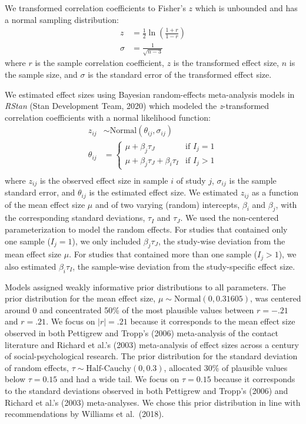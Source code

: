\documentclass[12pt, letterpaper]{article}
\begin{document}
We transformed correlation coefficients to Fisher's \(z\) which is
unbounded and has a normal sampling distribution: \begin{align*} 
z & = \frac{1}{2} \ln\left(\frac{1 + r}{1 - r}\right) \\ \sigma & = \frac{1}{\sqrt{n - 3}} \end{align*}
where \(r\) is the sample correlation coefficient, \(z\) is the
transformed effect size, \(n\) is the sample size, and \(\sigma\) is the
standard error of the transformed effect size.

We estimated effect sizes using Bayesian random-effects meta-analysis
models in \emph{RStan} (Stan Development Team, 2020) which modeled the
\emph{z}-transformed correlation coefficients with a normal likelihood
function:
\begin{align*} z_{ij} &\sim \text{Normal}(\theta_{ij}, \sigma_{ij}) \\ \theta_{ij} &= \begin{cases} \mu + \beta_j\tau_J & \text{if } I_j = 1 \\ \mu + \beta_j\tau_J + \beta_i\tau_I & \text{if } I_j > 1 \end{cases} \\ \end{align*}
where \(z_{ij}\) is the observed effect size in sample \(i\) of study
\(j\), \(\sigma_{ij}\) is the sample standard error, and \(\theta_{ij}\)
is the estimated effect size. We estimated \(z_{ij}\) as a function of
the mean effect size \(\mu\) and of two varying (random) intercepts,
\(\beta_i\) and \(\beta_j\), with the corresponding standard deviations,
\(\tau_I\) and \(\tau_J\). We used the non-centered parameterization to
model the random effects. For studies that contained only one sample
(\(I_j = 1\)), we only included \(\beta_j\tau_J\), the study-wise
deviation from the mean effect size \(\mu\). For studies that contained
more than one sample (\(I_j > 1\)), we also estimated \(\beta_i\tau_I\),
the sample-wise deviation from the study-specific effect size.

Models assigned weakly informative prior distributions to all
parameters. The prior distribution for the mean effect size,
\(\mu \sim \text{Normal}(0, 0.31605)\), was centered around 0 and
concentrated 50\% of the most plausible values between \(r = -.21\) and
\(r = .21\). We focus on \(|r| = .21\) because it corresponds to the
mean effect size observed in both Pettigrew and Tropp's (2006)
meta-analysis of the contact literature and Richard et al.'s (2003)
meta-analysis of effect sizes across a century of social-psychological
research. The prior distribution for the standard deviation of random
effects, \(\tau \sim \text{Half-Cauchy}(0, 0.3)\), allocated 30\% of
plausible values below \(\tau = 0.15\) and had a wide tail. We focus on
\(\tau = 0.15\) because it corresponds to the standard deviations
observed in both Pettigrew and Tropp's (2006) and Richard et al.'s
(2003) meta-analyses. We chose this prior distribution in line with
recommendations by Williams et al.~(2018).
\end{document}
